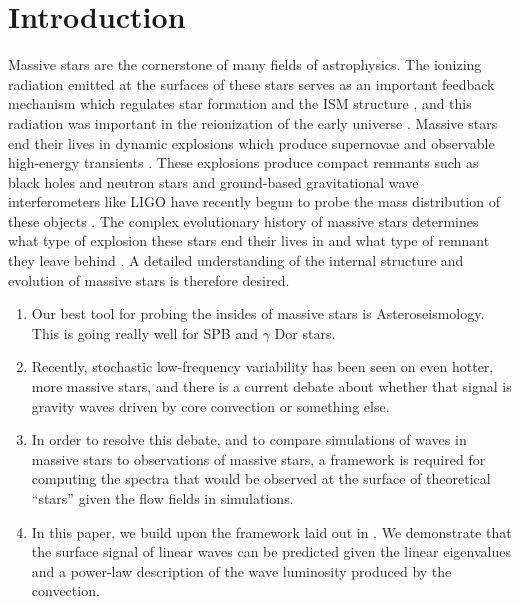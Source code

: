 \section{Introduction}
\label{sec:introduction}

Massive stars are the cornerstone of many fields of astrophysics.
The ionizing radiation emitted at the surfaces of these stars serves as an important feedback mechanism which regulates star formation and the ISM structure \citep{lancaster_etal_2021}, and this radiation was important in the reionization of the early universe \citep{bromm_larson_2004}.
Massive stars end their lives in dynamic explosions which produce supernovae and observable high-energy transients \citep{heger_2003}.
These explosions produce compact remnants such as black holes and neutron stars and ground-based gravitational wave interferometers like LIGO have recently begun to probe the mass distribution of these objects \citep{abbott_etal_2018}.
The complex evolutionary history of massive stars determines what type of explosion these stars end their lives in and what type of remnant they leave behind \citep{farmer_etal_2016}.
A detailed understanding of the internal structure and evolution of massive stars is therefore desired.


\begin{enumerate}
\item Our best tool for probing the insides of massive stars is Asteroseismology.
    This is going really well for SPB and $\gamma$ Dor stars.
\item Recently, stochastic low-frequency variability has been seen on even hotter, more massive stars, and there is a current debate about whether that signal is gravity waves driven by core convection or something else.
\item In order to resolve this debate, and to compare simulations of waves in massive stars to observations of massive stars, a framework is required for computing the spectra that would be observed at the surface of theoretical ``stars'' given the flow fields in simulations.
\item In this paper, we build upon the framework laid out in \citet{lecoanet_etal_2019,lecoanet_etal_2021}. 
    We demonstrate that the surface signal of linear waves can be predicted given the linear eigenvalues and a power-law description of the wave luminosity produced by the convection.
\end{enumerate}
